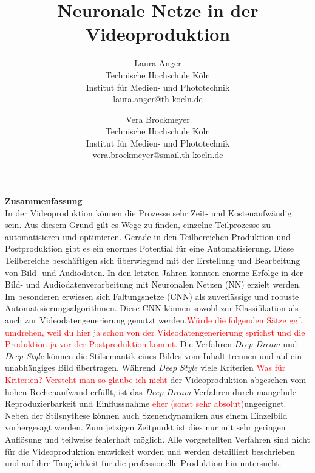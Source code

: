 \documentclass[times, 11pt,twocolumn]{article}
\begin{document}
\title{Neuronale Netze in der Videoproduktion}

\author{Laura Anger\\
Technische Hochschule K\"oln \\ Institut f\"ur Medien- und Phototechnik \\  laura.anger@th-koeln.de \\
\and
Vera Brockmeyer\\
Technische Hochschule K\"oln \\ Institut f\"ur Medien- und Phototechnik \\ vera.brockmeyer@smail.th-koeln.de \\
}

\maketitle
\thispagestyle{empty}


\large{\textbf{Zusammenfassung}}\\ \small %
{} 
In der Videoproduktion können die Prozesse sehr Zeit- und Kostenaufwändig sein. Aus diesem Grund gilt es Wege zu finden, einzelne Teilprozesse zu automatisieren und optimieren. Gerade in den Teilbereichen Produktion und Postproduktion gibt es ein enormes Potential für eine Automatisierung. Diese Teilbereiche beschäftigen sich überwiegend mit der Erstellung und Bearbeitung von Bild- und Audiodaten. In den letzten Jahren konnten enorme Erfolge in der Bild- und Audiodatenverarbeitung mit Neuronalen Netzen (NN) erzielt werden. Im besonderen erwiesen sich Faltungsnetze (CNN) als zuverlässige und robuste Automatisierungsalgorithmen. Diese CNN können sowohl zur Klassifikation als auch zur Videodatengenerierung genutzt werden.\textcolor{red}{Würde die folgenden Sätze ggf. umdrehen, weil du hier ja schon von der Videodatengenerierung sprichst und die Produktion ja vor der Postproduktion kommt.} Die Verfahren \textit{Deep Dream} und \textit{Deep Style} können die Stilsemantik eines Bildes vom Inhalt trennen und auf ein unabhängiges Bild übertragen. Während \textit{Deep Style} viele Kriterien \textcolor{red}{Was für Kriterien? Versteht man so glaube ich nicht} der Videoproduktion abgesehen vom hohen Rechenaufwand erfüllt, ist das \textit{Deep Dream} Verfahren durch mangelnde Reproduzierbarkeit und Einflussnahme \textcolor{red}{eher (sonst sehr absolut)}ungeeignet. Neben der Stilsnythese können auch Szenendynamiken aus einem Einzelbild vorhergesagt werden. Zum jetzigen Zeitpunkt ist dies nur mit sehr geringen Auflösung und teilweise fehlerhaft möglich. Alle vorgestellten Verfahren sind nicht für die Videoproduktion entwickelt worden und werden detailliert beschrieben und auf ihre Tauglichkeit für die professionelle Produktion hin untersucht. \\
\end{document}
